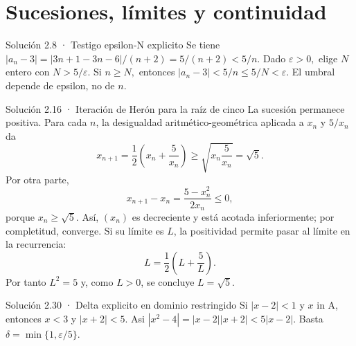\documentclass[10pt,a4paper,oneside,openany]{book}
\begin{document}
\chapter{Sucesiones, límites y continuidad}
\begin{PSevenSolutionFixed}{Solución 2.8 · Testigo epsilon-N explicito}
Se tiene \(|a_n-3|=|3n+1-3n-6|/(n+2)=5/(n+2)<5/n\). Dado \(\varepsilon >0,\) elige \(N\) entero con \(N>5/\varepsilon \). Si \(n\ge N,\) entonces \(|a_n-3|<5/n\le 5/N<\varepsilon \). El umbral depende de epsilon, no de \(n\).
\end{PSevenSolutionFixed}
\begin{PSevenSolutionFixed}{Solución 2.16 · Iteración de Herón para la raíz de cinco}
La sucesión permanece positiva. Para cada \(n\), la desigualdad aritmético-geométrica aplicada a \(x_n\) y \(5/x_n\) da
\[
x_{n+1}=\frac12\left(x_n+\frac5{x_n}\right)\ge\sqrt{x_n\frac5{x_n}}=\sqrt5.
\]
Por otra parte,
\[
x_{n+1}-x_n=\frac{5-x_n^2}{2x_n}\le0,
\]
porque \(x_n\ge\sqrt5\). Así, \((x_n)\) es decreciente y está acotada inferiormente; por completitud, converge. Si su límite es \(L\), la positividad permite pasar al límite en la recurrencia:
\[
L=\frac12\left(L+\frac5L\right).
\]
Por tanto \(L^2=5\) y, como \(L>0\), se concluye \(L=\sqrt5\).
\end{PSevenSolutionFixed}
\begin{PSevenSolutionFixed}{Solución 2.30 · Delta explicito en dominio restringido}
Si \(|x-2|<1\) y \(x\) in A, entonces \(x<3\) y \(|x+2|<5\). Asi \(|x^{2}-4|=|x-2||x+2|<5|x-2|\). Basta \(\delta =\min\{1,\varepsilon /5\}\).
\end{PSevenSolutionFixed}
\end{document}
